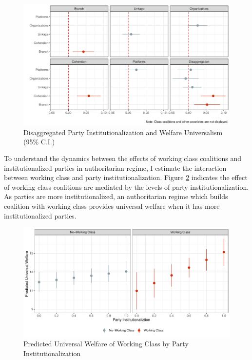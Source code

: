 \documentclass[11pt, notitlepage]{article}
\begin{document}
\begin{figure}[!htbt]
	\centering
	\includegraphics[width=0.85\linewidth]{"../3. Datasets_Codebooks/Figures/Plot4"}
	\caption{Disaggregated Party Institutionalization and Welfare Universalism (95\% C.I.)}
	\label{fig:plot4}
\end{figure}

To understand the dynamics between the effects of working class coalitions and institutionalized parties in authoritarian regime, I estimate the interaction between working class and party institutionalization. Figure \ref{fig:plot5} indicates the effect of working class coalitions are mediated by the levels of party institutionalization. As parties are more institutionalized, an authoritarian regime which builds coalition with working class provides universal welfare when it has more institutionalized parties. 

\begin{figure}[!htbt]
	\centering
	\includegraphics[width=0.85\linewidth]{"../3. Datasets_Codebooks/Figures/Plot5"}
	\caption{Predicted Universal Welfare of Working Class by Party Institutionalization}
	\label{fig:plot5}
\end{figure}

%
\end{document}
